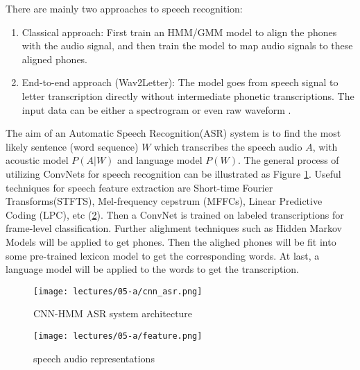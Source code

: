 There are mainly two approaches to speech recognition:
\begin{enumerate}
    \item Classical approach: First train an HMM/GMM model to align the phones with the audio signal, and then train the model to map audio signals to these aligned phones.
    \item End-to-end approach (Wav2Letter): The model goes from speech signal to letter transcription directly without intermediate phonetic transcriptions. The input data can be either a spectrogram or even raw waveform \cite{Collobert2017Wav2LetterAE}.
\end{enumerate}
The aim of an Automatic Speech Recognition(ASR) system is to find the most likely sentence (word sequence) $W$ which transcribes the speech audio $A$, with acoustic model $P(A|W)$ and language model $P(W)$. The general process of utilizing ConvNets for speech recognition can be illustrated as Figure \ref{fig:cnn_asr}.
Useful techniques for speech feature extraction are Short-time Fourier Transforms(STFTS), Mel-frequency cepstrum (MFFCs), Linear Predictive Coding (LPC), etc (\ref{fig:feature}). Then a ConvNet is trained on labeled transcriptions for frame-level classification. Further alighment techniques such as Hidden Markov Models will be applied to get phones. Then the alighed phones will be fit into some pre-trained lexicon model to get the corresponding words. At last, a language model will be applied to the words to get the transcription. 
\begin{figure}[ht]
    \centering
    \texttt{[image: lectures/05-a/cnn\_asr.png]}
    \caption{CNN-HMM ASR system architecture}
    \label{fig:cnn_asr}
\end{figure}
\begin{figure}[ht]
    \centering
    \texttt{[image: lectures/05-a/feature.png]}
    \caption{speech audio representations}
    \label{fig:feature}
\end{figure}